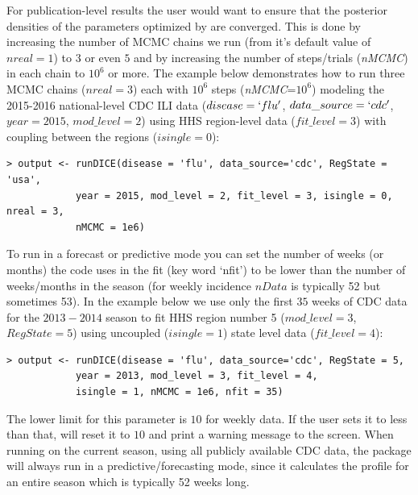 \documentclass[a4paper]{article}
\begin{document}


For publication-level results the user would want to ensure that the posterior densities of the parameters optimized by  are converged.  This is done by increasing the number of MCMC chains we run (from it's default value of $nreal=1$) to $3$ or even $5$ and by increasing the number of steps/trials (\emph{nMCMC}) in each chain to $10^6$ or more.  The example below demonstrates how to run three MCMC chains ($nreal=3$) each with $10^6$ steps (\emph{nMCMC}=$10^6$) modeling the 2015-2016 national-level CDC ILI data ($disease= `flu'$, $data\_source=`cdc'$, $year=2015$, $mod\_level=2$) using HHS region-level data ($fit\_level=3$) with coupling between the regions ($isingle=0$):

\begin{verbatim}
> output <- runDICE(disease = 'flu', data_source='cdc', RegState = 'usa',
            year = 2015, mod_level = 2, fit_level = 3, isingle = 0, nreal = 3,
            nMCMC = 1e6)
\end{verbatim}

To run  in a forecast or predictive mode you can set the number of weeks (or months) the code uses in the fit (key word `nfit') to be lower than the number of weeks/months in the season (for weekly incidence $nData$ is typically 52 but sometimes 53). In the example below we use only the first $35$ weeks of CDC data for the $2013-2014$ season to fit HHS region number 5 ($mod\_level=3$, $RegState=5$) using uncoupled ($isingle=1$) state level data ($fit\_level=4$):

\begin{verbatim}
> output <- runDICE(disease = 'flu', data_source='cdc', RegState = 5,
            year = 2013, mod_level = 3, fit_level = 4,
            isingle = 1, nMCMC = 1e6, nfit = 35)
\end{verbatim}

The lower limit for this parameter is $10$ for weekly data. If the user sets it to less than that,  will reset it to $10$ and print a warning message to the screen.
When running on the current season, using all publicly available CDC data, the  package will always run in a predictive/forecasting mode, since it calculates the profile for an entire season which is typically 52 weeks long.
\end{document}
